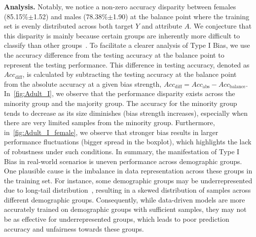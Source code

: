 \noindent
\textbf{Analysis.}
Notably, we notice a non-zero accuracy disparity between females (85.15\%{\scriptsize $\pm$1.52}) and males (78.38\%{\scriptsize $\pm$1.90}) at the balance point where the training set is evenly distributed across both target $Y$ and attribute $A$.
We conjecture that this disparity is mainly because certain groups are inherently more difficult to classify than other groups~\cite{FR_inherent_bias}.
To facilitate a clearer analysis of Type I Bias, we use the accuracy difference from the testing accuracy at the balance point to represent the testing performance. 
This difference in testing accuracy, denoted as $Acc_{\text{diff}}$, is calculated by subtracting the testing accuracy at the balance point from the absolute accuracy at a given bias strength, \ie $Acc_{\text{diff}} = Acc_{\text{abs}} - Acc_{\text{balance}}$.
In~\cref{fig:Adult_I}, we observe that the performance disparity exists across the minority group and the majority group.
The accuracy for the minority group tends to decrease as its size diminishes (bias strength increases), especially when there are very limited samples from the minority group.
Furthermore, in~\cref{fig:Adult_I_female}, we observe that stronger bias results in larger performance fluctuations (bigger spread in the boxplot), which highlights the lack of robustness under such conditions.
In summary, the manifestation of Type I Bias in real-world scenarios is uneven performance across demographic groups.
One plausible cause is the imbalance in data representation across these groups in the training set.
For instance, some demographic groups may be underrepresented due to long-tail distribution~\cite{long_tail}, resulting in a skewed distribution of samples across different demographic groups.
Consequently, while data-driven models are more accurately trained on demographic groups with sufficient samples, they may not be as effective for underrepresented groups, which leads to poor prediction accuracy and unfairness towards these groups.












